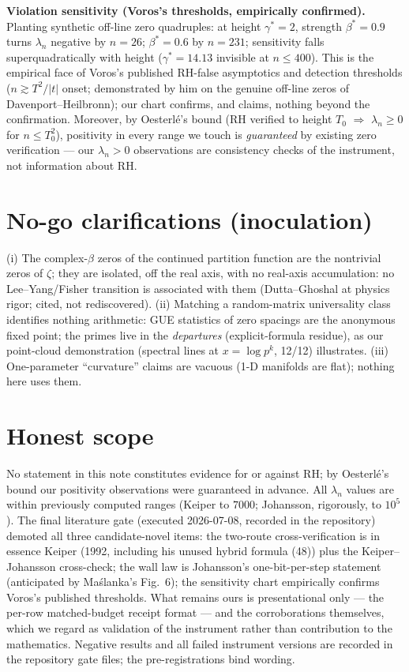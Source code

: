 \documentclass[11pt]{article}
\begin{document}
\textbf{Violation sensitivity (Voros's thresholds, empirically confirmed).} Planting synthetic
off-line zero quadruples: at height $\gamma^*=2$, strength $\beta^*=0.9$ turns $\lambda_n$ negative
by $n=26$; $\beta^*=0.6$ by $n=231$; sensitivity falls superquadratically with height
($\gamma^*=14.13$ invisible at $n\le400$). This is the empirical face of Voros's published RH-false
asymptotics and detection thresholds ($n\gtrsim T^2/|t|$ onset; demonstrated by him on the genuine
off-line zeros of Davenport--Heilbronn); our chart confirms, and claims, nothing beyond the
confirmation. Moreover, by Oesterl\'e's bound (RH verified to height $T_0$ $\Rightarrow$
$\lambda_n\ge0$ for $n\le T_0^2$), positivity in every range we touch is \emph{guaranteed} by
existing zero verification --- our $\lambda_n>0$ observations are consistency checks of the
instrument, not information about RH.

\section{No-go clarifications (inoculation)}
(i) The complex-$\beta$ zeros of the continued partition function are the nontrivial zeros of
$\zeta$; they are isolated, off the real axis, with no real-axis accumulation: no Lee--Yang/Fisher
transition is associated with them (Dutta--Ghoshal at physics rigor; cited, not rediscovered).
(ii) Matching a random-matrix universality class identifies nothing arithmetic: GUE statistics of
zero spacings are the anonymous fixed point; the primes live in the \emph{departures} (explicit-formula
residue), as our point-cloud demonstration (spectral lines at $x=\log p^k$, 12/12) illustrates.
(iii) One-parameter ``curvature'' claims are vacuous (1-D manifolds are flat); nothing here uses them.

\section{Honest scope}
No statement in this note constitutes evidence for or against RH; by Oesterl\'e's bound our
positivity observations were guaranteed in advance. All $\lambda_n$ values are within previously
computed ranges (Keiper to $7000$; Johansson, rigorously, to $10^5$). The final literature gate
(executed 2026-07-08, recorded in the repository) demoted all three candidate-novel items: the
two-route cross-verification is in essence Keiper (1992, including his unused hybrid formula (48))
plus the Keiper--Johansson cross-check; the wall law is Johansson's one-bit-per-step statement
(anticipated by Ma\'slanka's Fig.~6); the sensitivity chart empirically confirms Voros's published
thresholds. What remains ours is presentational only --- the per-row matched-budget receipt format
--- and the corroborations themselves, which we regard as validation of the instrument rather than
contribution to the mathematics. Negative results and all failed instrument versions are recorded in
the repository gate files; the pre-registrations bind wording.
\end{document}

